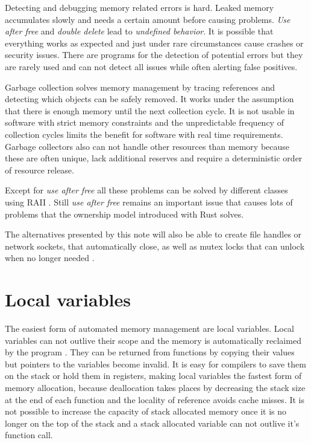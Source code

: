 \documentclass[conference,twocolumn]{IEEEtran}
\begin{document}
Detecting and debugging memory related errors is hard. Leaked memory accumulates slowly and needs a certain amount before causing problems. \emph{Use after free} and \emph{double delete} lead to \emph{undefined behavior}. It is possible that everything works as expected and just under rare circumstances cause crashes or security issues. There are programs for the detection of potential errors but they are rarely used and can not detect all issues while often alerting false positives.

Garbage collection solves memory management by tracing references and detecting which objects can be safely removed. It works under the assumption that there is enough memory until the next collection cycle. It is not usable in software with strict memory constraints and the unpredictable frequency of collection cycles limits the benefit for software with real time requirements.
Garbage collectors also can not handle other resources than memory because these are often unique, lack additional reserves and require a deterministic order of resource release.


Except for \emph{use after free} all these problems can be solved by different classes using RAII \cite{stroustrupFoundationsCpp}. Still \emph{use after free} remains an important issue that causes lots of problems that the ownership model introduced with Rust \cite{RustBook} solves.
 
 The alternatives presented by this note will also be able to create file handles or network sockets, that automatically close, as well as mutex locks that can unlock when no longer needed \cite{stroustrupFoundationsCpp}.


\section{Local variables}
The easiest form of automated memory management are local variables. Local variables can not outlive their scope and the memory is automatically reclaimed by the program \cite{cpp14std}. They can be returned from functions by copying their values but pointers to the variables become invalid. It is easy for compilers to save them on the stack or hold them in registers, making local variables the fastest form of memory allocation, because deallocation takes places by decreasing the stack size at the end of each function and the locality of reference avoids cache misses. It is not possible to increase the capacity of stack allocated memory once it is no longer on the top of the stack and a stack allocated variable can not outlive it's function call.
\end{document}
